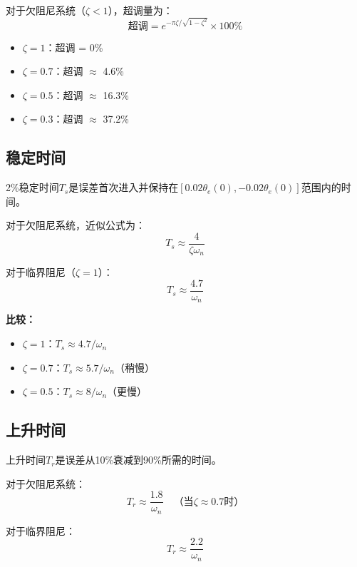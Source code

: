 \documentclass[12pt,a4paper]{article}
\begin{document}
对于欠阻尼系统（$\zeta < 1$），超调量为：
\begin{equation}
\text{超调} = e^{-\pi\zeta/\sqrt{1-\zeta^2}} \times 100\%
\end{equation}

\begin{itemize}
\item $\zeta = 1$：超调 = 0\%
\item $\zeta = 0.7$：超调 $\approx$ 4.6\%
\item $\zeta = 0.5$：超调 $\approx$ 16.3\%
\item $\zeta = 0.3$：超调 $\approx$ 37.2\%
\end{itemize}

\subsection{稳定时间}

2\%稳定时间$T_s$是误差首次进入并保持在$[0.02\theta_e(0), -0.02\theta_e(0)]$范围内的时间。

对于欠阻尼系统，近似公式为：
\begin{equation}
T_s \approx \frac{4}{\zeta\omega_n}
\end{equation}

对于临界阻尼（$\zeta = 1$）：
\begin{equation}
T_s \approx \frac{4.7}{\omega_n}
\end{equation}

\textbf{比较：}
\begin{itemize}
\item $\zeta = 1$：$T_s \approx 4.7/\omega_n$
\item $\zeta = 0.7$：$T_s \approx 5.7/\omega_n$（稍慢）
\item $\zeta = 0.5$：$T_s \approx 8/\omega_n$（更慢）
\end{itemize}

\subsection{上升时间}

上升时间$T_r$是误差从10\%衰减到90\%所需的时间。

对于欠阻尼系统：
\begin{equation}
T_r \approx \frac{1.8}{\omega_n} \quad \text{（当$\zeta \approx 0.7$时）}
\end{equation}

对于临界阻尼：
\begin{equation}
T_r \approx \frac{2.2}{\omega_n}
\end{equation}
\end{document}
